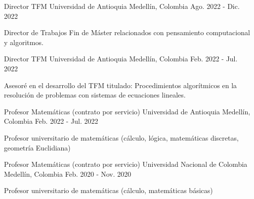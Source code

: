 


\begin{cventries}


\cventry
{Director TFM} %
{Universidad de Antioquia} %
{Medellín, Colombia} %
{Ago. 2022 - Dic. 2022} %
{ %
\begin{cvitems}
\item {Director de Trabajos Fin de Máster relacionados con pensamiento computacional y algoritmos.\hfill \break}
\end{cvitems}
}


\cventry
{Director TFM} %
{Universidad de Antioquia} %
{Medellín, Colombia} %
{Feb. 2022 - Jul. 2022} %
{ %
\begin{cvitems}
\item {Asesoré en el desarrollo del TFM titulado: Procedimientos algorítmicos en la resolución de problemas con sistemas de ecuaciones lineales.\hfill \break}
\end{cvitems}
}


\cventry
{Profesor Matemáticas (contrato por servicio)} %
{Universidad de Antioquia} %
{Medellín, Colombia} %
{Feb. 2022 - Jul. 2022} %
{ %
\begin{cvitems}
\item {Profesor universitario de matemáticas (cálculo, lógica, matemáticas discretas, geometría Euclidiana)\hfill \break}
\end{cvitems}
}


\cventry
{Profesor Matemáticas (contrato por servicio)} %
{Universidad Nacional de Colombia} %
{Medellín, Colombia} %
{Feb. 2020 - Nov. 2020} %
{ %
\begin{cvitems}
\item {Profesor universitario de matemáticas (cálculo, matemáticas básicas)\hfill \break}
\end{cvitems}
}

\end{cventries}